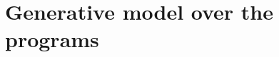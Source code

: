 \documentclass{article}
\begin{document}
\begin{figure}[h]




      

    

\end{figure}

\section{Generative model over the programs}
\end{document}

